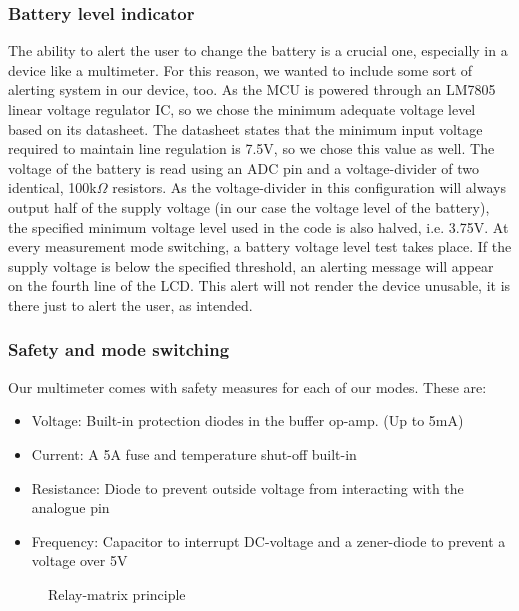 \subsubsection{Battery level indicator}
\label{sec:method_bat_indicator}
The ability to alert the user to change the battery is a crucial one, especially in a device like a multimeter. For this reason, we wanted to include some sort of alerting system in our device, too. As the MCU is powered through an LM7805 linear voltage regulator IC, so we chose the minimum adequate voltage level based on its datasheet. The datasheet states that the minimum input voltage required to maintain line regulation is 7.5V, so we chose this value as well. The voltage of the battery is read using an ADC pin and a voltage-divider of two identical, 100k$\Omega$ resistors. As the voltage-divider in this configuration will always output half of the supply voltage (in our case the voltage level of the battery), the specified minimum voltage level used in the code is also halved, i.e. 3.75V. At every measurement mode switching, a battery voltage level test takes place. If the supply voltage is below the specified threshold, an alerting message will appear on the fourth line of the LCD. This alert will not render the device unusable, it is there just to alert the user, as intended.

\subsubsection{Safety and mode switching}
\label{sec:method_safety_relays}
Our multimeter comes with safety measures for each of our modes. These are:
\begin{itemize}
    \item Voltage:      Built-in protection diodes in the buffer op-amp. (Up to 5mA)
    \item Current:      A 5A fuse and temperature shut-off built-in
    \item Resistance:   Diode to prevent outside voltage from interacting with the analogue pin
    \item Frequency:    Capacitor to interrupt DC-voltage and a zener-diode to prevent a voltage over 5V
\end{itemize}

\begin{figure}[h]
    \centering
    \caption{Relay-matrix principle}
    \label{fig:relmat}
\end{figure}

